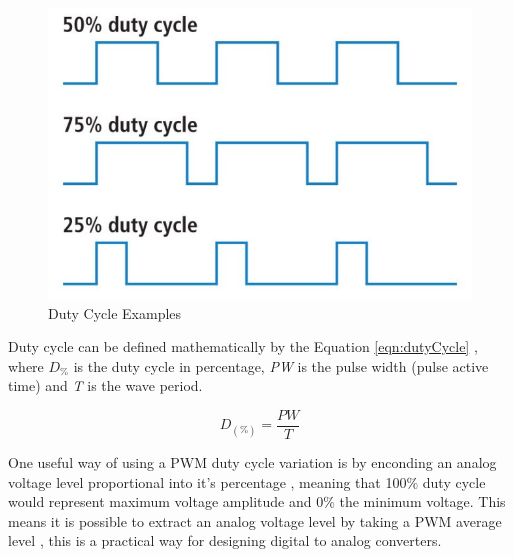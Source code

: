 	\begin{figure}[htbp]
		\centering
			\includegraphics[width=.45\textwidth]{figuras/fig-dutyCycle}
		\caption{Duty Cycle Examples \cite{fig-dutyCycle}}
		\label{fig:dutyCycle}
	\end{figure}

	Duty cycle can be defined mathematically by the Equation \ref{eqn:dutyCycle} \cite{james2001fundamentals}, where \textit{$D_{\%}$} is the duty cycle in percentage, \textit{PW} is the pulse width (pulse active time) and \textit{T} is the wave period. 

	\begin{equation}\label{eqn:dutyCycle}
		D_{ \left( \% \right) } =\frac{PW}{T}
	\end{equation}

	One useful way of using a PWM duty cycle variation is by enconding an analog voltage level proportional into it's percentage \cite{holmes2003pulse}, meaning that 100$\%$ duty cycle would represent maximum voltage amplitude and 0$\%$ the minimum voltage. This means it is possible to extract an analog voltage level by taking a PWM average level \cite{alter2008pwm}, this is a practical way for designing digital to analog converters.

